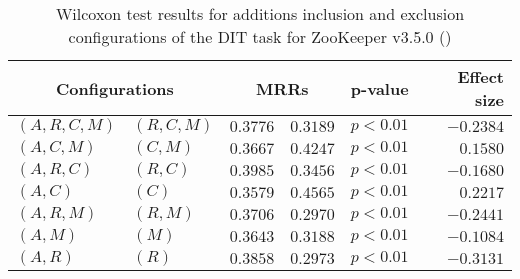 
\begin{table}
\begin{spacing}{1.2}
\centering
\caption{Wilcoxon test results for additions inclusion and exclusion configurations of the DIT task for ZooKeeper v3.5.0 (\ctwo)}
\label{table:versus-wilcox-zookeeper-dit-additions}
\begin{tabular}{ll|rr|rr}
\toprule
      \multicolumn{2}{c|}{Configurations} &                \multicolumn{2}{c|}{MRRs} &             p-value & Effect size \\
\midrule
 $(A,R,C,M)$ &  $(R,C,M)$ &  $\bm{0.3776}$ &       $0.3189$ & $p<0.01$ &   $-0.2384$ \\
   $(A,C,M)$ &    $(C,M)$ &       $0.3667$ &  $\bm{0.4247}$ & $p<0.01$ &    $0.1580$ \\
   $(A,R,C)$ &    $(R,C)$ &  $\bm{0.3985}$ &       $0.3456$ & $p<0.01$ &   $-0.1680$ \\
     $(A,C)$ &      $(C)$ &       $0.3579$ &  $\bm{0.4565}$ & $p<0.01$ &    $0.2217$ \\
   $(A,R,M)$ &    $(R,M)$ &  $\bm{0.3706}$ &       $0.2970$ & $p<0.01$ &   $-0.2441$ \\
     $(A,M)$ &      $(M)$ &  $\bm{0.3643}$ &       $0.3188$ & $p<0.01$ &   $-0.1084$ \\
     $(A,R)$ &      $(R)$ &  $\bm{0.3858}$ &       $0.2973$ & $p<0.01$ &   $-0.3131$ \\
\bottomrule
\end{tabular}

\end{spacing}
\end{table}

